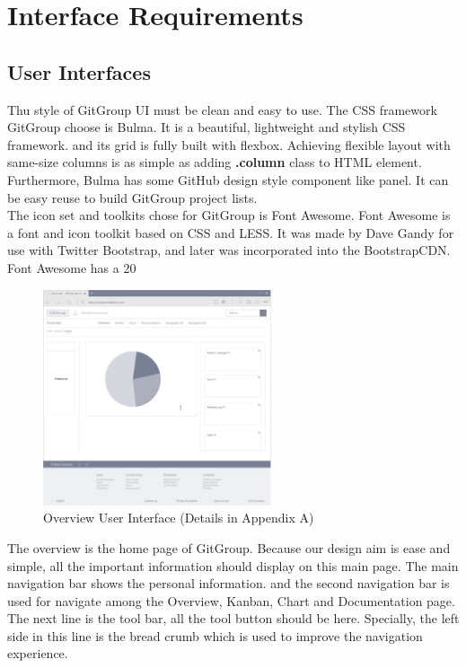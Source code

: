 \documentclass[12pt,a4paper]{report}
\begin{document}
\chapter{Interface Requirements}
\section{User Interfaces}
Thu style of GitGroup UI must be clean and easy to use. The CSS framework GitGroup choose is Bulma. It is a beautiful, lightweight and stylish CSS framework. and its grid is fully built with flexbox. Achieving flexible layout with same-size columns is as simple as adding \textbf{.column} class to HTML element. Furthermore, Bulma has some GitHub design style component like panel. It can be easy reuse to build GitGroup project lists.\\
The icon set and toolkits chose for GitGroup is Font Awesome. Font Awesome is a font and icon toolkit based on CSS and LESS. It was made by Dave Gandy for use with Twitter Bootstrap, and later was incorporated into the BootstrapCDN. Font Awesome has a 20%
\begin{figure}[H]
	\centering
	\includegraphics[width=0.6\textwidth]{./pics/OverviewInterface.png}
	\caption{Overview User Interface (Details in Appendix A)}
\end{figure}
The overview is the home page of GitGroup. Because our design aim is ease and simple, all the important information should display on this main page. The main navigation bar shows the personal information. and the second navigation bar is used for navigate among the Overview, Kanban, Chart and Documentation page. The next line is the tool bar, all the tool button should be here. Specially, the left side in this line is the bread crumb which is used to improve the navigation experience. 
\end{document}
